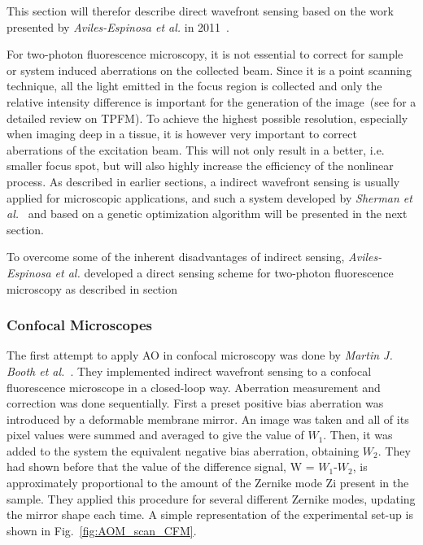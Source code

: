 This section will therefor describe direct wavefront sensing based on the work presented by \emph{Aviles-Espinosa et al.} in 2011~\cite{scan_TPFM_guide_start}.\newline

For two-photon fluorescence microscopy, it is not essential to correct for sample or system induced aberrations on the collected beam. Since it is a point scanning technique, all the light emitted in the focus region is collected and only the relative intensity difference is important for the generation of the image~(see \cite{scan_TPFM_review} for a detailed review on TPFM). To achieve the highest possible resolution, especially when imaging deep in a tissue, it is however very important to correct aberrations of the excitation beam. This will not only result in a better, i.e. smaller focus spot, but will also highly increase the efficiency of the nonlinear process. As described in earlier sections, a indirect wavefront sensing is usually applied for microscopic applications, and such a system developed by \emph{Sherman et al.}~\cite{Genetic_MPFM} and based on a genetic optimization algorithm will be presented in the next section. 

To overcome some of the inherent disadvantages of indirect sensing, \emph{Aviles-Espinosa et al.} developed a direct sensing scheme for two-photon fluorescence microscopy as described in section~

\subsubsection{Confocal Microscopes}
\label{sec:ConfocalMicroscopes}

The first attempt to apply AO in confocal microscopy was done by \textit{Martin J. Booth et al.}~\cite{scan_CFM}. They implemented indirect wavefront sensing to a confocal fluorescence microscope in a closed-loop way. Aberration measurement and correction was done sequentially. First a preset positive bias aberration was introduced by a deformable membrane mirror. An image was taken and all of its pixel values were summed and averaged to give the value of $W_1$. Then, it was added to the system the equivalent negative bias aberration, obtaining $W_2$. They had shown before that the value of the difference signal, W = $W_1$-$W_2$, is approximately proportional to the amount of the Zernike mode Zi present in the sample. They applied this procedure for several different Zernike modes, updating the mirror shape each time. A simple representation of the experimental set-up is shown in Fig.~\ref{fig:AOM_scan_CFM}.

